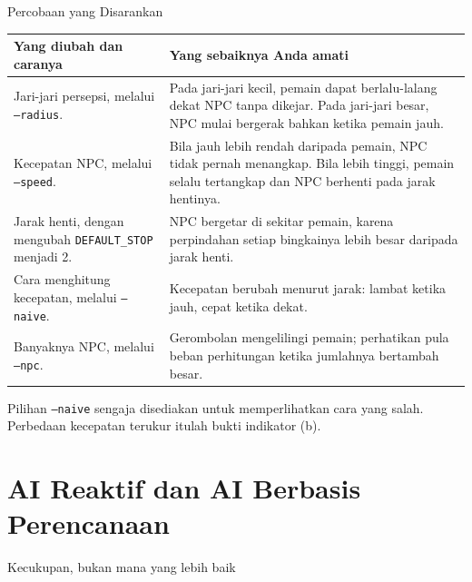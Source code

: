 \documentclass[aspectratio=169,10pt]{beamer}
\begin{document}
\begin{frame}{Percobaan yang Disarankan}
{\scriptsize
\renewcommand{\arraystretch}{1.10}
\begin{tabularx}{\textwidth}{@{}>{\raggedright\arraybackslash}p{4.6cm}
    >{\raggedright\arraybackslash}X@{}}
\toprule
\textbf{Yang diubah dan caranya} & \textbf{Yang sebaiknya Anda amati} \\
\midrule
Jari-jari persepsi, melalui \texttt{--radius}. &
  Pada jari-jari kecil, pemain dapat berlalu-lalang dekat NPC tanpa dikejar.
  Pada jari-jari besar, NPC mulai bergerak bahkan ketika pemain jauh. \\
\addlinespace
Kecepatan NPC, melalui \texttt{--speed}. &
  Bila jauh lebih rendah daripada pemain, NPC tidak pernah menangkap. Bila
  lebih tinggi, pemain selalu tertangkap dan NPC berhenti pada jarak
  hentinya. \\
\addlinespace
Jarak henti, dengan mengubah \texttt{DEFAULT\_STOP} menjadi 2. &
  NPC bergetar di sekitar pemain, karena perpindahan setiap bingkainya lebih
  besar daripada jarak henti. \\
\addlinespace
Cara menghitung kecepatan, melalui \texttt{--naive}. &
  Kecepatan berubah menurut jarak: lambat ketika jauh, cepat ketika dekat. \\
\addlinespace
Banyaknya NPC, melalui \texttt{--npc}. &
  Gerombolan mengelilingi pemain; perhatikan pula beban perhitungan ketika
  jumlahnya bertambah besar. \\
\bottomrule
\end{tabularx}}
\vspace{0.12cm}
\begin{kotak}
Pilihan \texttt{--naive} sengaja disediakan untuk memperlihatkan cara yang
salah. Perbedaan kecepatan terukur itulah bukti indikator (b).
\end{kotak}
\end{frame}

\section{AI Reaktif dan AI Berbasis Perencanaan}
  {Kecukupan, bukan mana yang lebih baik}
\end{document}
